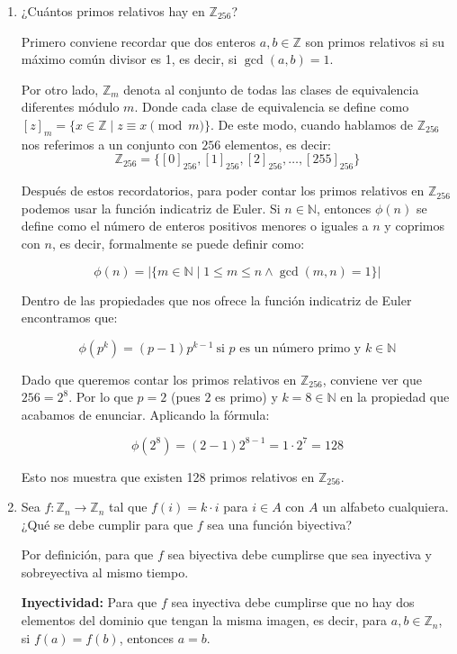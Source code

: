 \documentclass[12pt, a4paper]{article}
\begin{document}
\begin{enumerate}

    \item ¿Cuántos primos relativos hay en $\mathbb{Z}_{256}$?

Primero conviene recordar que dos enteros $a, b \in \mathbb{Z}$ son primos relativos si su máximo común divisor
es 1, es decir, si $\gcd(a,b) = 1$.

Por otro lado, $\mathbb{Z}_m$ denota al conjunto de todas las clases de equivalencia diferentes módulo $m$. Donde
cada clase de equivalencia se define como $[z]_m = \{x \in \mathbb{Z} \mid z \equiv x \pmod{m}\}$. De este modo, cuando
hablamos de $\mathbb{Z}_{256}$ nos referimos a un conjunto con $256$ elementos, es decir:
\[
\mathbb{Z}_{256} = \{[0]_{256}, [1]_{256}, [2]_{256}, \dots, [255]_{256}\}
\]

Después de estos recordatorios, para poder contar los primos relativos en $\mathbb{Z}_{256}$ podemos usar la
función indicatriz de Euler. Si $n \in \mathbb{N}$, entonces $\phi(n)$ se define como el número de enteros
positivos menores o iguales a $n$ y coprimos con $n$, es decir, formalmente se puede definir como:

\[
\phi(n) = |\{m \in \mathbb{N} \mid 1 \le m \le n \land \gcd(m, n) = 1\}|
\]

Dentro de las propiedades que nos ofrece la función indicatriz de Euler encontramos que:

\[
\phi(p^k) = (p-1)p^{k-1}\ \text{si } p \text{ es un número primo y } k \in \mathbb{N}
\]

Dado que queremos contar los primos relativos en $\mathbb{Z}_{256}$, conviene ver que $256 = 2^8$. Por lo que $p=2$ 
(pues $2$ es primo) y $k=8 \in \mathbb{N}$ en la propiedad que acabamos de enunciar. Aplicando la fórmula:

\[
\phi(2^8) = (2-1)2^{8-1} = 1 \cdot 2^7 = 128
\]

Esto nos muestra que existen 128 primos relativos en $\mathbb{Z}_{256}$.




    \item Sea $f:\mathbb{Z}_{n}\rightarrow\mathbb{Z}_{n}$ tal que $f(i)=k \cdot i$ para $i\in A$ con $A$ un alfabeto cualquiera. ¿Qué se debe cumplir para que $f$ sea una función biyectiva?

Por definición, para que $f$ sea biyectiva debe cumplirse que sea inyectiva y sobreyectiva al mismo tiempo.

\textbf{Inyectividad:} Para que $f$ sea inyectiva debe cumplirse que no hay dos elementos del dominio
que tengan la misma imagen, es decir, para $a,b \in \mathbb{Z}_n$, si $f(a) = f(b)$, entonces $a=b$.


\end{enumerate}
\end{document}
